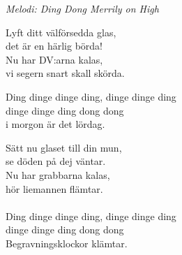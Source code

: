 {\footnotesize\textit{Melodi: Ding Dong Merrily on High}}\par
\vspace{10pt}
Lyft ditt välförsedda glas,\\
det är en härlig börda!\\
Nu har DV:arna kalas,\\
vi segern snart skall skörda.\par
\vspace{10pt}
Ding dinge dinge ding, dinge dinge ding\\
dinge dinge ding dong dong\\
i morgon är det lördag.\par
\vspace{10pt}
Sätt nu glaset till din mun,\\
se döden på dej väntar.\\
Nu har grabbarna kalas,\\
hör liemannen flämtar.\\
\\
Ding dinge dinge ding, dinge dinge ding\\
dinge dinge ding dong dong\\
Begravningsklockor klämtar.
